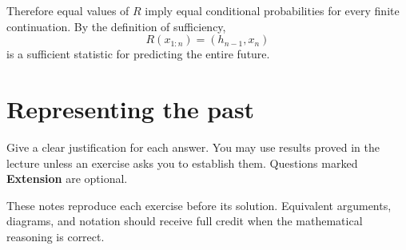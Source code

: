 \documentclass[11pt]{article}
\begin{document}
\begin{solution}[ex:p2-4]
\begin{enumerate}
        Therefore equal values of $R$ imply equal conditional probabilities
        for every finite continuation. By the definition of sufficiency,
        \[
          R(x_{1:n})=(h_{n-1},x_n)
        \]
        is a sufficient statistic for predicting the entire future.
    \end{enumerate}
\end{solution}


\section{Representing the past}\label{sec:representing-the-past}

\begin{callout}[note][Instructions]
    Give a clear justification for each answer. You may use results proved in
    the lecture unless an exercise asks you to establish them. Questions marked
    \textbf{Extension} are optional.
\end{callout}

\begin{solutionsonly}
\begin{callout}[note][Instructions]
    These notes reproduce each exercise before its solution. Equivalent
    arguments, diagrams, and notation should receive full credit when the
    mathematical reasoning is correct.
\end{callout}
\end{solutionsonly}
\end{document}
